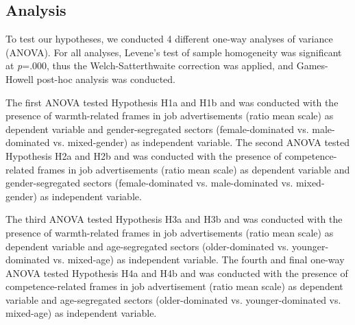 \documentclass[jou]{apa7}
\begin{document}
\subsection{Analysis}
\label{analysis}
To test our hypotheses, we conducted 4 different one-way analyses of variance (ANOVA). For all analyses, Levene’s test of sample homogeneity was significant at \textit{p}=.000, thus the Welch-Satterthwaite correction was applied, and Games-Howell post-hoc analysis was conducted.

The first ANOVA tested Hypothesis H1a and H1b and was conducted with the presence of warmth-related frames in job advertisements (ratio mean scale) as dependent variable and gender-segregated sectors (female-dominated vs. male-dominated vs. mixed-gender) as independent variable. The second ANOVA tested Hypothesis H2a and H2b and was conducted with the presence of competence-related frames in job advertisements (ratio mean scale) as dependent variable and gender-segregated sectors (female-dominated vs. male-dominated vs. mixed-gender) as independent variable.

The third ANOVA tested Hypothesis H3a and H3b and was conducted with the presence of warmth-related frames in job advertisements (ratio mean scale) as dependent variable and age-segregated sectors (older-dominated vs. younger-dominated vs. mixed-age) as independent variable. The fourth and final one-way ANOVA tested Hypothesis H4a and H4b and was conducted with the presence of competence-related frames in job advertisement (ratio mean scale) as dependent variable and age-segregated sectors (older-dominated vs. younger-dominated vs. mixed-age) as independent variable.

\end{document}
